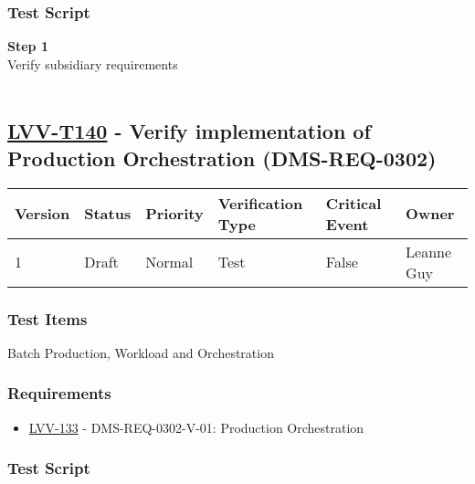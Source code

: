\hypertarget{test-script-116}{%
\subsubsection{Test Script}\label{test-script-116}}

\textbf{Step 1}\\
Verify subsidiary requirements\\
~\\

\hypertarget{lvv-t140---verify-implementation-of-production-orchestration-dms-req-0302}{%
\subsection{\texorpdfstring{\href{https://jira.lsstcorp.org/secure/Tests.jspa\#/testCase/LVV-T140}{LVV-T140}
- Verify implementation of Production Orchestration
(DMS-REQ-0302)}{LVV-T140 - Verify implementation of Production Orchestration (DMS-REQ-0302)}}\label{lvv-t140---verify-implementation-of-production-orchestration-dms-req-0302}}

\begin{longtable}[]{@{}llllll@{}}
\toprule
Version & Status & Priority & Verification Type & Critical Event &
Owner\tabularnewline
\midrule
\endhead
1 & Draft & Normal & Test & False & Leanne Guy\tabularnewline
\bottomrule
\end{longtable}

\hypertarget{test-items-116}{%
\subsubsection{Test Items}\label{test-items-116}}

Batch Production, Workload and Orchestration~

\hypertarget{requirements-117}{%
\subsubsection{Requirements}\label{requirements-117}}

\begin{itemize}
\tightlist
\item
  \href{https://jira.lsstcorp.org/browse/LVV-133}{LVV-133} -
  DMS-REQ-0302-V-01: Production Orchestration
\end{itemize}

\hypertarget{test-script-117}{%
\subsubsection{Test Script}\label{test-script-117}}

